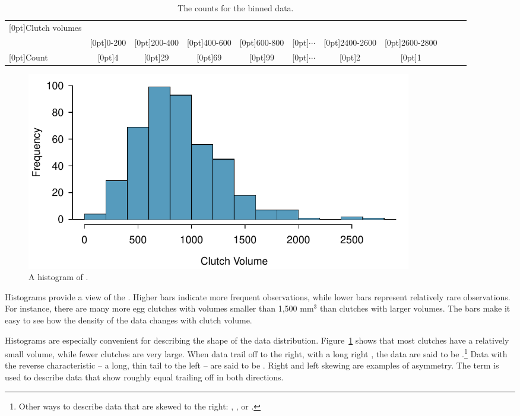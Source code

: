 \begin{doublespace}
\begin{table}[ht]
	\centering\small
	\begin{tabular}{l ccc ccc ccc c}
		\hline
		\raisebox{-1.5ex}[0pt]{Clutch volumes} & \\
		& \raisebox{1.5ex}[0pt]{0-200} & \raisebox{1.5ex}[0pt]{200-400} & \raisebox{1.5ex}[0pt]{400-600} & \raisebox{1.5ex}[0pt]{600-800} & \raisebox{1.5ex}[0pt]{$\cdots$} & \raisebox{1.5ex}[0pt]{2400-2600} & \raisebox{1.5ex}[0pt]{2600-2800} \\
		\hline
		\raisebox{-.25ex}[0pt]{Count} & \raisebox{-.25ex}[0pt]{4} & \raisebox{-.25ex}[0pt]{29} & \raisebox{-.25ex}[0pt]{69} & \raisebox{-.25ex}[0pt]{99} & \raisebox{-.25ex}[0pt]{$\cdots$} & \raisebox{-.25ex}[0pt]{2} & \raisebox{-.25ex}[0pt]{1} \\
		\hline
	\end{tabular}
	\caption{The counts for the binned  data.}
	\label{frogBinnedClutchVolTable}
\end{table}

\begin{figure}[ht]
	\centering
	\includegraphics[width=0.82\textwidth]{ch_intro_to_data_oi_biostat/figures/frogHist/frogHist}
	\caption{A histogram of .}
	\label{frogHist}
\end{figure}

Histograms provide a view of the . Higher bars indicate more frequent observations, while lower bars represent relatively rare observations. For instance, there are many more egg clutches with volumes smaller than 1,500 $\textrm{mm}^{3}$ than clutches with larger volumes. The bars make it easy to see how the density of the data changes with clutch volume.

Histograms are especially convenient for describing the shape of the data distribution\label{shapeFirstDiscussed}. Figure~\ref{frogHist} shows that most clutches have a relatively small volume, while fewer clutches are very large. When data trail off to the right, with a long right , the data are said to be .\footnote{Other ways to describe data that are skewed to the right: , , or .} Data with the reverse characteristic -- a long, thin tail to the left -- are said to be . Right and left skewing are examples of asymmetry.  The term  is used to describe data that show roughly equal trailing off in both directions.


\end{doublespace}
